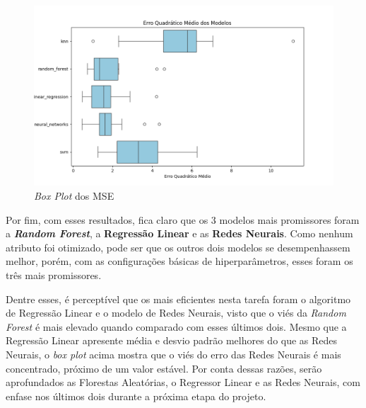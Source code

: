 \documentclass{report}
\begin{document}
\begin{figure}[h!]
  \centering
  \includegraphics[width=.85\linewidth]{images/plots/box_plots/mse.png}
  \caption{\label{img:mse_boxplot} \textit{Box Plot} dos MSE}
\end{figure}

Por fim, com esses resultados, fica claro que os 3 modelos mais promissores foram a \textbf{\textit{Random Forest}}, a \textbf{Regressão Linear} e as \textbf{Redes Neurais}. Como nenhum atributo
foi otimizado, pode ser que os outros dois modelos se desempenhassem melhor, porém, com as configurações básicas de hiperparâmetros, esses foram os três mais promissores.

Dentre esses, é perceptível que os mais eficientes nesta tarefa foram o algoritmo de Regressão Linear e o modelo de Redes Neurais, visto que o viés da \textit{Random Forest} é mais elevado quando
comparado com esses últimos dois. Mesmo que a Regressão Linear apresente média e desvio padrão melhores do que as Redes Neurais, o \textit{box plot} acima mostra que o viés do erro das Redes Neurais
é mais concentrado, próximo de um valor estável. Por conta dessas razões, serão aprofundados as Florestas Aleatórias, o Regressor Linear e as Redes Neurais, com enfase nos últimos dois durante a
próxima etapa do projeto.

\clearpage
\printbibliography
\thispagestyle{empty}
\end{document}
